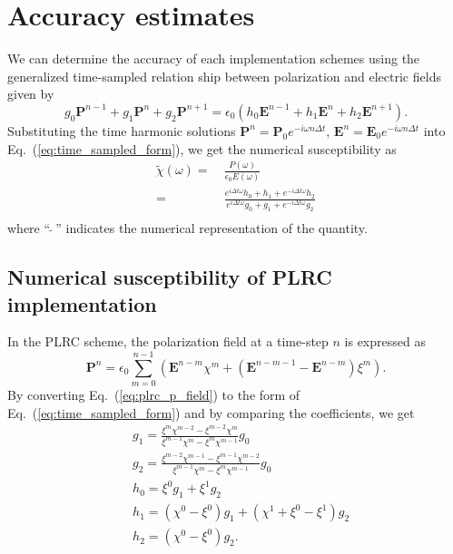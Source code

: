 \section{Accuracy estimates}
We can determine the accuracy of each implementation schemes using the generalized time-sampled relation ship between polarization and electric fields \cite{hulse_dispersive_1994, lin_accuracy_2009} given by
\begin{equation}
g_0 \mathbf{P}^{n-1} + g_1 \mathbf{P}^n + g_2 \mathbf{P}^{n+1} = \epsilon_0 \left(h_0 \mathbf{E}^{n-1} + h_1 \mathbf{E}^n + h_2 \mathbf{E}^{n+1} \right).
\label{eq:time_sampled_form}
\end{equation}
Substituting the time harmonic solutions $\mathbf{P}^n = \mathbf{P}_0 e^{-i \omega n \Delta t}$, $\mathbf{E}^n = \mathbf{E}_0 e^{-i \omega n \Delta t}$ into Eq.~(\ref{eq:time_sampled_form}), we get the numerical susceptibility as
\begin{equation}
\begin{split}
\tilde{\chi}(\omega) = &~ \frac{P(\omega)}{\epsilon_0 E(\omega)}\\
= &~ \frac{e^{i \Delta t \omega} h_0 + h_1 + e^{-i \Delta t \omega} h_2}{e^{i \Delta t \omega} g_0 + g_1 + e^{-i \Delta t \omega} g_2}\\
\end{split}
\end{equation}
where ``$\tilde{~~}$'' indicates the numerical representation of the quantity.

\subsection{Numerical susceptibility of PLRC implementation}
In the PLRC scheme, the polarization field at a time-step $n$ is expressed as \cite{kelley_piecewise_1996} 
\begin{equation}
\mathbf{P}^n = \epsilon_0 \sum_{m=0}^{n-1} \left ( \mathbf{E}^{n-m} \chi^m + \left ( \mathbf{E}^{n-m-1} - \mathbf{E}^{n-m} \right ) \xi^m \right ).
\label{eq:plrc_p_field}
\end{equation}
By converting  Eq.~(\ref{eq:plrc_p_field}) to the form of Eq.~(\ref{eq:time_sampled_form}) and by comparing the coefficients, we get
\begin{equation}
\begin{split}
& g_1 = \frac{\xi^m \chi^{m-2} - \xi^{m-2} \chi^m}{\xi^{m-1} \chi^m - \xi^m \chi^{m-1}} g_0\\
& g_2 = \frac{\xi^{m-2} \chi^{m-1} - \xi^{m-1} \chi^{m-2}}{\xi^{m-1} \chi^m - \xi^m \chi^{m-1}} g_0\\
& h_0 = \xi^0 g_1 + \xi^1 g_2\\
& h_1 = \left( \chi^0 - \xi^0 \right) g_1 + \left ( \chi^1 + \xi^0 - \xi^1 \right ) g_2\\
& h_2 = \left ( \chi^0 - \xi^0 \right ) g_2.
\end{split}
\end{equation}

